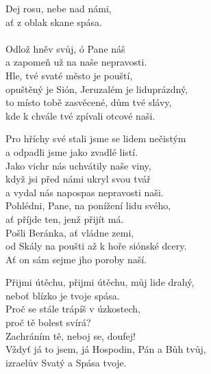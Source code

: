 \begin{translatioMulticol}{3}
Dej rosu, nebe nad námi,\\
ať z oblak skane spása.\\
\\
Odlož hněv svůj, ó Pane náš\\
a zapomeň už na naše nepravosti.\\
Hle, tvé svaté město je pouští,\\
opuštěný je Sión, Jeruzalém je liduprázdný,\\
to místo tobě zasvěcené, dům tvé slávy,\\
kde k chvále tvé zpívali otcové naši.\columnbreak

Pro hříchy své stali jsme se lidem nečistým\\
a odpadli jsme jako zvadlé listí.\\
Jako vichr nás uchvátily naše viny,\\
když jsi před námi ukryl svou tvář\\
a vydal nás napospas nepravosti naši.\\

Pohlédni, Pane, na ponížení lidu svého,\\
ať příjde ten, jenž přijít má.\\
Pošli Beránka, ať vládne zemi,\\
od Skály na poušti až k hoře siónské dcery.\\
Ať on sám sejme jho poroby naší.\columnbreak

Přijmi útěchu, přijmi útěchu, můj lide drahý,\\
neboť blízko je tvoje spása.\\
Proč se stále trápíš v úzkostech,\\
proč tě bolest svírá?\\
Zachráním tě, neboj se, doufej!\\
Vždyť já to jsem, já Hospodin, Pán a Bůh tvůj,\\
izraelův Svatý a Spása tvoje.
\end{translatioMulticol}
